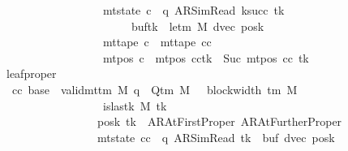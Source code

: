 \begin{isabellebody}
\ \ \ \ \ \ \ \ \ \ \ \ \ \ \ \ \ \ \ \ \ \ \ {\isasymand}\ mt{\isacharunderscore}{\kern0pt}state\ c{\isacharprime}{\kern0pt}{\isacharprime}{\kern0pt}\ {\isacharequal}{\kern0pt}\ {\isacharparenleft}{\kern0pt}q{\isacharcomma}{\kern0pt}\ AR{\isacharunderscore}{\kern0pt}SimRead{\isacharcomma}{\kern0pt}\ k{\isacharunderscore}{\kern0pt}succ\ tk{\isacharcomma}{\kern0pt}\ {}{\isacharcomma}{\kern0pt}\isanewline
\ \ \ \ \ \ \ \ \ \ \ \ \ \ \ \ \ \ \ \ \ \ \ \ \ \ \ \ \ buf{\isacharparenleft}{\kern0pt}tk\ {\isacharcolon}{\kern0pt}{\isacharequal}{\kern0pt}\ le{\isacharunderscore}{\kern0pt}tm\ M{\isacharparenright}{\kern0pt}{\isacharcomma}{\kern0pt}\ dvec{\isacharcomma}{\kern0pt}\ posk{\isacharparenright}{\kern0pt}\isanewline
\ \ \ \ \ \ \ \ \ \ \ \ \ \ \ \ \ \ \ \ \ \ \ {\isasymand}\ mt{\isacharunderscore}{\kern0pt}tape\ c{\isacharprime}{\kern0pt}{\isacharprime}{\kern0pt}\ {\isacharequal}{\kern0pt}\ mt{\isacharunderscore}{\kern0pt}tape\ cc\isanewline
\ \ \ \ \ \ \ \ \ \ \ \ \ \ \ \ \ \ \ \ \ \ \ {\isasymand}\ mt{\isacharunderscore}{\kern0pt}pos\ c{\isacharprime}{\kern0pt}{\isacharprime}{\kern0pt}\ {\isacharequal}{\kern0pt}\ {\isacharparenleft}{\kern0pt}mt{\isacharunderscore}{\kern0pt}pos\ cc{\isacharparenright}{\kern0pt}{\isacharparenleft}{\kern0pt}tk\ {\isacharcolon}{\kern0pt}{\isacharequal}{\kern0pt}\ Suc\ {\isacharparenleft}{\kern0pt}mt{\isacharunderscore}{\kern0pt}pos\ cc\ tk{\isacharparenright}{\kern0pt}{\isacharparenright}{\kern0pt}{\isachardoublequoteclose}\isanewline
\ \ \ \ \ \ \ leaf{\isacharunderscore}{\kern0pt}proper{\isacharcolon}{\kern0pt}\isanewline
\ \ \ \ \ \ \ \ {\isachardoublequoteopen}{\isasymAnd}cc\ base{\isacharprime}{\kern0pt}{\isachardot}{\kern0pt}\ {\isasymlbrakk}\ valid{\isacharunderscore}{\kern0pt}mttm\ M{\isacharsemicolon}{\kern0pt}\ q\ {\isasymin}\ Q{\isacharunderscore}{\kern0pt}tm\ M{\isacharsemicolon}{\kern0pt}\ {}\ {\isasymle}\ block{\isacharunderscore}{\kern0pt}width\ {\isacharparenleft}{\kern0pt}{\isasymGamma}{\isacharunderscore}{\kern0pt}tm\ M{\isacharparenright}{\kern0pt}{\isacharsemicolon}{\kern0pt}\isanewline
\ \ \ \ \ \ \ \ \ \ \ \ \ \ \ \ \ \ \ \ \ \ \ {\isasymnot}\ is{\isacharunderscore}{\kern0pt}last{\isacharunderscore}{\kern0pt}k\ M\ tk{\isacharsemicolon}{\kern0pt}\isanewline
\ \ \ \ \ \ \ \ \ \ \ \ \ \ \ \ \ \ \ \ \ \ \ posk\ tk\ {\isasymin}\ {\isacharbraceleft}{\kern0pt}AR{\isacharunderscore}{\kern0pt}AtFirstProper{\isacharcomma}{\kern0pt}\ AR{\isacharunderscore}{\kern0pt}AtFurtherProper{\isacharbraceright}{\kern0pt}{\isacharsemicolon}{\kern0pt}\isanewline
\ \ \ \ \ \ \ \ \ \ \ \ \ \ \ \ \ \ \ \ \ \ \ mt{\isacharunderscore}{\kern0pt}state\ cc\ {\isacharequal}{\kern0pt}\ {\isacharparenleft}{\kern0pt}q{\isacharcomma}{\kern0pt}\ AR{\isacharunderscore}{\kern0pt}SimRead{\isacharcomma}{\kern0pt}\ tk{\isacharcomma}{\kern0pt}\ {}{\isacharcomma}{\kern0pt}\ buf{\isacharcomma}{\kern0pt}\ dvec{\isacharcomma}{\kern0pt}\ posk{\isacharparenright}{\kern0pt}{\isacharsemicolon}{\kern0pt}\isanewline

\end{isabellebody}
